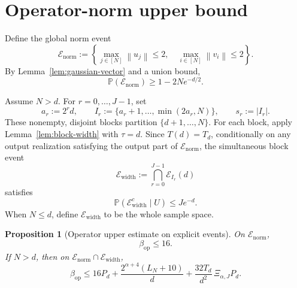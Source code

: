\documentclass[11pt]{article}
\newtheorem{proposition}[theorem]{Proposition}
\newcommand{\Pp}{\mathbb{P}}
\newcommand{\1}{\mathbf{1}}
\newcommand{\op}{\mathrm{op}}
\newcommand{\norm}[1]{\left\|#1\right\|}
\newcommand{\abs}[1]{\left|#1\right|}
\begin{document}
\section{Operator-norm upper bound}
\label{sec:operator-upper}

Define the global norm event
\[
 \mathcal E_{\mathrm{norm}}
 :=
 \left\{
 \max_{j\in[N]}\norm{u_j}\le2,
 \quad
 \max_{i\in[N]}\norm{v_i}\le2
 \right\}.
\]
By Lemma~\ref{lem:gaussian-vector} and a union bound,
\begin{equation}
 \Pp(\mathcal E_{\mathrm{norm}})
 \ge1-2Ne^{-d/2}.
 \label{eq:norm-event-probability}
\end{equation}

Assume \(N>d\).  For \(r=0,\ldots,J-1\), set
\[
 a_r:=2^r d,
 \qquad
 I_r:=\{a_r+1,\ldots,\min(2a_r,N)\},
 \qquad
 s_r:=\abs{I_r}.
\]
These nonempty, disjoint blocks partition \(\{d+1,\ldots,N\}\).  For each
block, apply Lemma~\ref{lem:block-width} with \(\tau=d\).  Since
\(T(d)=T_d\), conditionally on any output realization satisfying the output
part of \(\mathcal E_{\mathrm{norm}}\), the simultaneous block event
\[
 \mathcal E_{\mathrm{width}}
 :=
 \bigcap_{r=0}^{J-1}\mathcal E_{I_r}(d)
\]
satisfies
\begin{equation}
 \Pp\left(\mathcal E_{\mathrm{width}}^c\mid U\right)
 \le J e^{-d}.
 \label{eq:width-event-probability}
\end{equation}
When \(N\le d\), define \(\mathcal E_{\mathrm{width}}\) to be the whole
sample space.

\begin{proposition}[Operator upper estimate on explicit events]
\label{prop:operator-upper}
On \(\mathcal E_{\mathrm{norm}}\),
\[
 \beta_{\op}\le16.
\]
If \(N>d\), then on
\(\mathcal E_{\mathrm{norm}}\cap\mathcal E_{\mathrm{width}}\),
\[
 \beta_{\op}
 \le
 16P_d
 +\frac{2^{\alpha+4}(L_N+10)}{d}
 +\frac{32T_d}{d^2}\,\Xi_{\alpha,J}P_d.
\]
\end{proposition}
\end{document}
